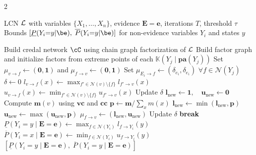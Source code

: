 \documentclass{article}
\newcommand{\kr}[1]{\mathbb{K}\!\left( #1 \right)}
\begin{document}
\begin{algorithm}[t]
\caption{Interval Belief Propagation (IBP)}
\label{alg:ibp}
\begin{multicols}{2}
\begin{algorithmic}[1]
\Require LCN $\mathcal{L}$ with variables $\{X_1, \ldots, X_n\}$, evidence $\mathbf{E} = \mathbf{e}$, iterations $T$, threshold $\tau$
\Ensure Bounds $[\underline{P}(Y_i{=}y|\be),\; \overline{P}(Y_i{=}y|\be)]$ for
        non-evidence variables $Y_i$ and states $y$

\Statex
\State Build credal network $\cC$ using chain graph factorization of $\mathcal{L}$
\State Build factor graph and initialize factors from extreme points of each $\kr{Y_j\mid \mathbf{pa}(Y_j)}$
\State Set $\mu_{v \to f} \gets (\mathbf{0}, \mathbf{1})$ and
       $\mu_{f \to v} \gets (\mathbf{0}, \mathbf{1})$
  \State Set $\mu_{E_i \to f} \gets (\delta_{e_i}, \delta_{e_i})$ $\forall f \in \mathcal{N}(Y_j)$
\EndFor
{}
  \State $\delta \gets 0$
  \Statex
      \State $l_{v \to f}(x) \gets \max_{f' \in \mathcal{N}(v) \setminus \{f\}}
             l_{f' \to v}(x)$
      \State $u_{v \to f}(x) \gets \min_{f' \in \mathcal{N}(v) \setminus \{f\}}
             u_{f' \to v}(x)$
    \EndFor
    \State Update $\delta$
  \EndFor
  \Statex
    \State $\mathbf{l}_{\mathrm{new}} \gets \mathbf{1}, \quad \mathbf{u}_{\mathrm{new}} \gets \mathbf{0}$
        \State Compute $\mathbf{m}(v)$ using $\mathbf{vc}$ and $\mathbf{cc}$
        \State $\mathbf{p} \gets \mathbf{m} / \sum_{x} m(x)$
        \State $\mathbf{l}_{\mathrm{new}} \gets \min(\mathbf{l}_{\mathrm{new}}, \mathbf{p})$
        \State $\mathbf{u}_{\mathrm{new}} \gets \max(\mathbf{u}_{\mathrm{new}}, \mathbf{p})$
      \EndFor
    \EndFor
    \State $\mu_{f \to v} \gets (\mathbf{l}_{\mathrm{new}}, \mathbf{u}_{\mathrm{new}})$
    \State Update $\delta$
  \EndFor
  \If{$\delta < \tau$} \textbf{break} \EndIf
\EndFor
\Statex
{}
    \State $\underline{P}(Y_i{=}y \mid \mathbf{E}{=}\mathbf{e}) \gets \max_{f \in \mathcal{N}(Y_i)} l_{f \to Y_i}(y)$
    \State $\overline{P}(Y_i{=}x \mid \mathbf{E}{=}\mathbf{e}) \gets \min_{f \in \mathcal{N}(Y_i)} u_{f \to Y_i}(y)$
  \EndFor
\EndFor
\State \Return $[\underline{P}(Y_i{=}y \mid \mathbf{E}{=}\mathbf{e}),\; \overline{P}(Y_i{=}y \mid \mathbf{E}{=}\mathbf{e})]$
\end{algorithmic}
\end{multicols}
\end{algorithm}
\end{document}
